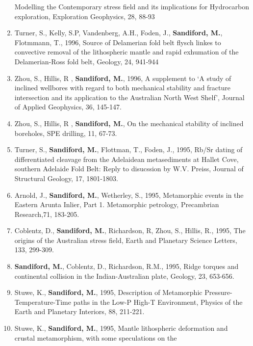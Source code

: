 \documentclass[
]{article}
\begin{document}
\begin{enumerate}
  Modelling the Contemporary stress field and its implications for
  Hydrocarbon exploration, Exploration Geophysics, 28, 88-93
\item
  Turner, S., Kelly, S.P, Vandenberg, A.H., Foden, J.,
  \textbf{Sandiford, M.}, Flotmmann, T., 1996, Source of Delamerian fold
  belt flysch linkes to convective removal of the lithospheric mantle
  and rapid exhumation of the Delamerian-Ross fold belt, Geology, 24,
  941-944 
\item
  Zhou, S., Hillis, R , \textbf{Sandiford, M.}, 1996, A supplement to `A
  study of inclined wellbores with regard to both mechanical stability
  and fracture intersection and its application to the Australian North
  West Shelf', Journal of Applied Geophysics, 36,
  145-147.
\item
  Zhou, S., Hillis, R , \textbf{Sandiford, M.}, On the mechanical
  stability of inclined boreholes, SPE drilling, 11, 67-73.
\item
  Turner, S., \textbf{Sandiford, M.}, Flottman, T., Foden, J., 1995,
  Rb/Sr dating of differentiated cleavage from the Adelaidean
  metasediments at Hallet Cove, southern Adelaide Fold Belt: Reply to
  disucssion by W.V. Preiss, Journal of Structural Geology, 17,
  1801-1803.\\
\item
  Arnold, J., \textbf{Sandiford, M.}, Wetherley, S., 1995, Metamorphic
  events in the Eastern Arunta Inlier, Part 1. Metamorphic petrology,
  Precambrian Research,71, 183-205. 
\item
  Coblentz, D., \textbf{Sandiford, M.}, Richardson, R, Zhou, S., Hillis,
  R., 1995, The origins of the Australian stress field, Earth and
  Planetary Science Letters, 133, 299-309. 
\item
  \textbf{Sandiford, M.}, Coblentz, D., Richardson, R.M., 1995, Ridge
  torques and continental collision in the Indian-Australian plate,
  Geology, 23, 653-656. 
\item
  Stuwe, K., \textbf{Sandiford, M.}, 1995, Description of Metamorphic
  Pressure- Temperature-Time paths in the Low-P High-T Environment,
  Physics of the Earth and Planetary Interiors, 88, 211-221.\\
\item
  Stuwe, K., \textbf{Sandiford, M.}, 1995, Mantle lithospheric
  deformation and crustal metamorphism, with some speculations on the

\end{enumerate}
\end{document}
